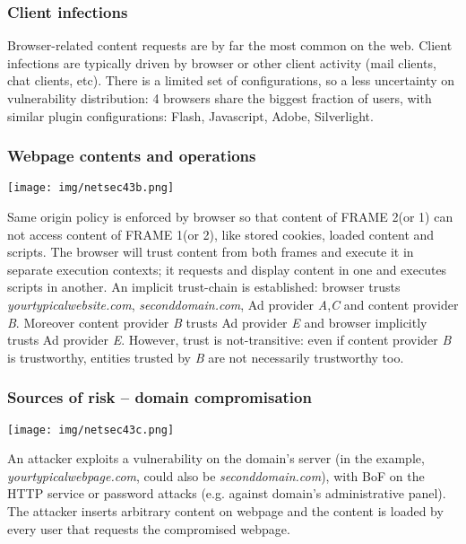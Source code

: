 \documentclass[a4paper, 10pt, titlepage]{article}
\begin{document}
\subsubsection*{Client infections}
Browser-related content requests are by far the most common on the web. Client infections are typically driven by browser or other client activity (mail clients, chat clients, etc).
There is a limited set of configurations, so a less uncertainty on vulnerability distribution: 4 browsers share the biggest fraction of users, with similar plugin configurations: Flash, Javascript, Adobe, Silverlight.

\subsubsection*{Webpage contents and operations}
\begin{center}
	\texttt{[image: img/netsec43b.png]}
\end{center}
Same origin policy is enforced by browser so that content of FRAME 2(or 1) can not access content of FRAME 1(or 2), like stored cookies, loaded content and scripts. The browser will trust content from both frames and execute it in separate execution contexts; it requests and display content in one and executes scripts in another.
An implicit trust-chain is established: browser trusts \textit{yourtypicalwebsite.com}, \textit{seconddomain.com}, Ad provider \textit{A},\textit{C} and content provider \textit{B}. Moreover content provider \textit{B} trusts Ad provider \textit{E} and browser implicitly trusts Ad provider \textit{E}.
However, trust is not-transitive: even if content provider \textit{B} is trustworthy, entities trusted by \textit{B} are not necessarily trustworthy too.

\subsubsection*{Sources of risk – domain compromisation}
\begin{center}
	\texttt{[image: img/netsec43c.png]}
\end{center}
An attacker exploits a vulnerability on the domain’s server (in the example, \textit{yourtypicalwebpage.com}, could also be \textit{seconddomain.com}), with BoF on the HTTP service or password attacks (e.g. against domain’s administrative panel). The attacker inserts arbitrary content on webpage and the content is loaded by every user that requests the compromised webpage.
\end{document}
